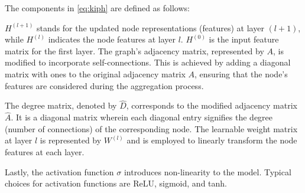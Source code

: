 The components in \cref{eq:kiph} are defined as follows:

$H^{(l+1)}$ stands for the updated node representations (features) at layer $(l+1)$, while $H^{(l)}$ indicates the node features at layer $l$. $H^{(0)}$ is the input feature matrix for the first layer. The graph's adjacency matrix, represented by $A$, is modified to incorporate self-connections. This is achieved by adding a diagonal matrix with ones to the original adjacency matrix $A$, ensuring that the node's features are considered during the aggregation process.

The degree matrix, denoted by $\hat{D}$, corresponds to the modified adjacency matrix $\hat{A}$. It is a diagonal matrix wherein each diagonal entry signifies the degree (number of connections) of the corresponding node. The learnable weight matrix at layer $l$ is represented by $W^{(l)}$ and is employed to linearly transform the node features at each layer.

Lastly, the activation function $\sigma$ introduces non-linearity to the model. Typical choices for activation functions are ReLU, sigmoid, and tanh.




